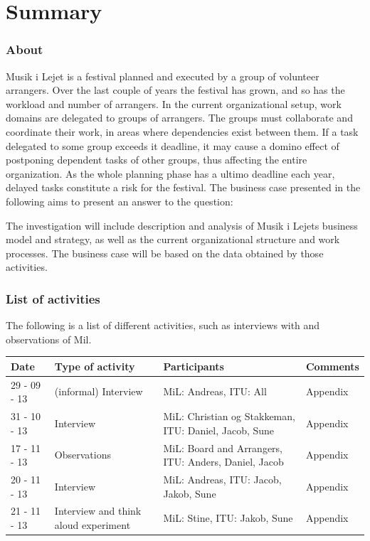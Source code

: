\part{Summary}

\section{About}
Musik i Lejet is a festival planned and executed by a group of volunteer arrangers. Over the last couple of years the festival has grown, and so has the workload and number of arrangers. In the current organizational setup, work domains are delegated to groups of arrangers. The groups must collaborate and coordinate their work, in areas where dependencies exist between them. If a task delegated to some group exceeds it deadline, it may cause a domino effect of postponing dependent tasks of other groups, thus affecting the entire organization. As the whole planning phase has a ultimo deadline each year, delayed tasks constitute a risk for the festival. The business case presented in the following aims to present an answer to the question:
\vspace{1pt}
\begin{center}
\end{center}
\vspace{1pt}
\noindent
The investigation will include description and analysis of Musik i Lejets business model and strategy, as well as the current organizational structure and work processes. The business case will be based on the data obtained by those activities.

\section{List of activities}
The following is a list of different activities, such as interviews with and observations of Mil.
\begin{center}
\begin{table}[H]
    \begin{tabular}{|p{3cm}|p{3cm}|p{3cm}|p{6cm}|}
    \hline
    \textbf{Date} & \textbf{Type of activity} & \textbf{Participants} & \textbf{Comments} \\ \hline
    29 - 09 - 13 & (informal) Interview & MiL: Andreas, ITU: All & Appendix  \\ \hline
    31 - 10 - 13 & Interview & MiL: Christian og Stakkeman, ITU: Daniel, Jacob, Sune &  Appendix  \\ \hline
    17 - 11 - 13 & Observations & MiL: Board and Arrangers, ITU: Anders, Daniel, Jacob & Appendix \\ \hline
    20 - 11 - 13 & Interview & MiL: Andreas, ITU: Jacob, Jakob, Sune & Appendix \\ \hline
    21 - 11 - 13 & Interview and think aloud experiment & MiL: Stine, ITU: Jakob, Sune & Appendix \\ \hline
    \end{tabular}
\end{table}
\end{center}


